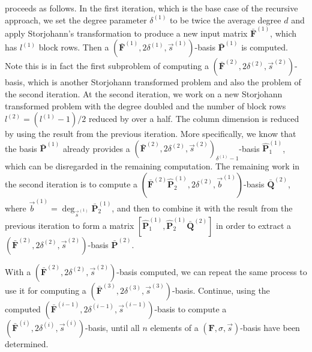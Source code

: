  proceeds as follows. In the first iteration,
which is the base case of the recursive approach, we set the degree
parameter $\delta^{\left(1\right)}$ to be twice the average degree
$d$ and apply Storjohann's transformation to produce a new input
matrix $\bar{\mathbf{F}}^{\left(1\right)}$, which has $l^{\left(1\right)}$
block rows. Then a $(\bar{\mathbf{F}}^{\left(1\right)},2\delta^{\left(1\right)},\vec{s}^{\left(1\right)})$-basis
$\bar{\mathbf{P}}^{\left(1\right)}$ is computed. Note this is in
fact the first subproblem of computing a $(\bar{\mathbf{F}}^{\left(2\right)},2\delta^{\left(2\right)},\vec{s}^{\left(2\right)})$-basis,
which is another Storjohann transformed problem and also the problem
of the second iteration. At the second iteration, we work on a
new Storjohann transformed problem with the degree doubled and the
number of block rows $l^{\left(2\right)}=(l^{\left(1\right)}-1)/2$
reduced by over a half. The column dimension is reduced by using the
result from the previous iteration. More specifically, we know that
the basis $\bar{\mathbf{P}}^{\left(1\right)}$ already provides a
$(\bar{\mathbf{F}}^{\left(2\right)},2\delta^{\left(2\right)},\vec{s}^{\left(2\right)})_{\delta^{\left(1\right)}-1}$-basis
$\hat{\mathbf{P}}_{1}^{\left(1\right)}$, which can be disregarded
in the remaining computation. The remaining work in the second
iteration is to compute a $(\bar{\mathbf{F}}^{\left(2\right)}\hat{\mathbf{P}}_{2}^{\left(1\right)},2\delta^{\left(2\right)},\vec{b}^{\left(1\right)})$-basis
$\bar{\mathbf{Q}}^{\left(2\right)}$, where $\vec{b}^{\left(1\right)}=\deg_{\vec{s}^{\left(1\right)}}\bar{\mathbf{P}}_{2}^{\left(1\right)}$,
and then to combine it with the result from the previous iteration
to form a matrix $[\hat{\mathbf{P}}_{1}^{\left(1\right)},\hat{\mathbf{P}}_{2}^{\left(1\right)}\bar{\mathbf{Q}}^{\left(2\right)}]$
in order to extract a $(\bar{\mathbf{F}}^{\left(2\right)},2\delta^{\left(2\right)},\vec{s}^{\left(2\right)})$-basis
$\bar{\mathbf{P}}^{\left(2\right)}$.

With a $(\bar{\mathbf{F}}^{\left(2\right)},2\delta^{\left(2\right)},\vec{s}^{\left(2\right)})$-basis
computed, we can repeat the same process to use it for computing a
$(\bar{\mathbf{F}}^{\left(3\right)},2\delta^{\left(3\right)},\vec{s}^{\left(3\right)})$-basis.
Continue, using the computed $(\bar{\mathbf{F}}^{\left(i-1\right)},2\delta^{\left(i-1\right)},\vec{s}^{\left(i-1\right)})$-basis
to compute a $(\bar{\mathbf{F}}^{\left(i\right)},2\delta^{\left(i\right)},\vec{s}^{\left(i\right)})$-basis,
until all $n$ elements of a $\left(\mathbf{F},\sigma,\vec{s}\right)$-basis
have been determined.



%
\begin{comment}
\begin{thm}
Algorithm \prettyref{alg:mab} computes a $\left(\mathbf{F},\sigma,\vec{s}\right)$-basis
correctly.\end{thm}
\begin{pf}
This follows from \prettyref{lem:simplifySecondSubproblem}, \prettyref{lem:disregardComputedBasisElements},
and \prettyref{lem:computationAtTopLevel}. 
\end{pf}

\end{comment}
{} 
